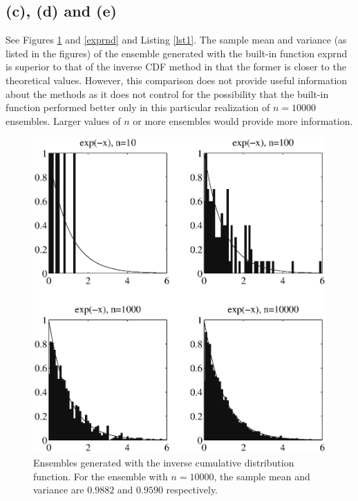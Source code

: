 \documentclass[fleqn, letterpaper]{tufte-handout}
\begin{document}
\subsection{(c), (d) and (e)}
See Figures \ref{rand} and \ref{exprnd} and Listing \ref{lst1}. The sample mean and variance (as listed in the figures) of the ensemble generated with the built-in function {\ttfamily exprnd} is superior to that of the inverse CDF method in that the former is closer to the theoretical values. However, this comparison does not provide useful information about the methods as it does not control for the possibility that the built-in function performed better only in this particular realization of $n=10000$ ensembles. Larger values of $n$ or more ensembles would provide more information.\\
\begin{figure}
        \includegraphics[width=\textwidth]{problem1}
        \caption{Ensembles generated with the inverse cumulative distribution function.
        For the ensemble with $n=10000$, the sample mean and variance are $0.9882$ and $0.9590$ respectively.}
        \label{rand}
\end{figure}
\end{document}
